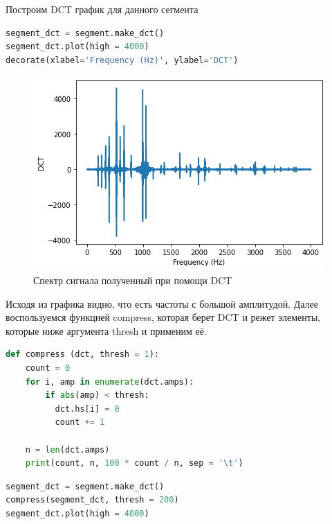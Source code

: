 Построим DCT график для данного сегмента

\begin{lstlisting}[language=Python]
segment_dct = segment.make_dct()
segment_dct.plot(high = 4000)
decorate(xlabel='Frequency (Hz)', ylabel='DCT')
\end{lstlisting}

\begin{figure}[H]
	\begin{center}
		\includegraphics[scale=1]{fig/lab06/lab06_05.png}
		\caption{Спектр сигнала полученный при помощи DCT}
	\end{center}
\end{figure}

Исходя из графика видно, что есть частоты с большой амплитудой. Далее воспользуемся функцией compress, которая берет DCT и режет элементы, которые ниже аргумента thresh и применим её.

\begin{lstlisting}[language=Python]
def compress (dct, thresh = 1):
    count = 0
    for i, amp in enumerate(dct.amps):
        if abs(amp) < thresh:
          dct.hs[i] = 0
          count += 1

    n = len(dct.amps)
    print(count, n, 100 * count / n, sep = '\t')
\end{lstlisting}

\begin{lstlisting}[language=Python]
segment_dct = segment.make_dct()
compress(segment_dct, thresh = 200)
segment_dct.plot(high = 4000)
\end{lstlisting}

